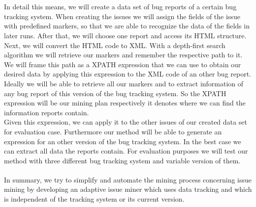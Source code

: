  \\ \\
In detail this means, we will create a data set of bug reports of a certain bug tracking system. When creating the issues we will assign the fields of the issue with predefined markers, so that we are able to recognize the data of the fields in later runs. After that, we will choose one report and access its HTML structure. Next, we will convert the HTML code to XML. With a depth-first search algorithm we will retrieve our markers and remember the respective path to it. We will frame this path as a XPATH expression that we can use to obtain our desired data by applying this expression to the XML code of an other bug report. Ideally we will be able to retrieve all our markers and to extract information of any bug report of this version of the bug tracking system. So the XPATH expression will be our mining plan respectively it denotes where we can find the information reports contain. \\ Given this expression, we can apply it to the other issues of our created data set for evaluation case. Furthermore our method will be able to generate an expression for an other version of the bug tracking system. In the best case we can extract all data the reports contain. For evaluation purposes we will test our method with three different bug tracking system and variable version of them. \\ \\ In summary, we try to simplify and automate the mining process concerning issue mining by developing an adaptive issue miner which uses data tracking and which is independent of the tracking system or its current version.



